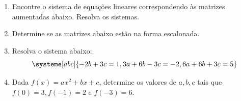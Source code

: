 \documentclass[a4paper,5pt]{amsbook}
\begin{document}
\begin{enumerate}
	\vspace{0.5cm}
	\item Encontre o sistema de equa\c{c}\~oes lineares correspondendo \`as matrizes
		aumentadas abaixo. Resolva os sistemas.

		\vspace{0.3cm}

	\vspace{0.5cm}
    \item Determine se as matrizes abaixo est\~ao na forma escalonada.

		\vspace{0.3cm}

	\vspace{0.5cm}
	\item Resolva o sistema abaixo:
		\[\systeme[abc]{
				-2b + 3c = 1,
				3a + 6b - 3c = -2,
				6a + 6b + 3c = 5
			}\]

    \vspace{0.5cm}
    \item Dada $f(x)=ax^2+bx+c$, determine os valores de $a,b,c$ tais que $f(0)=3,
        f(-1)=2$ e $f(-3)=6$.


\end{enumerate}
\end{document}
